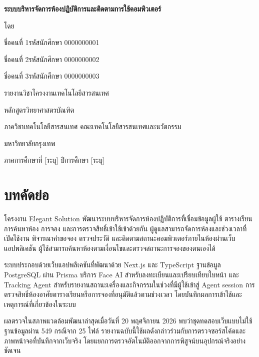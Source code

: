 \documentclass[14pt,a4paper,oneside]{extreport}
\begin{document}
\begin{titlepage}\centering
\vspace*{23mm}
{\LARGE\bfseries ระบบบริหารจัดการห้องปฏิบัติการและติดตามการใช้คอมพิวเตอร์\par}
\vspace{3mm}{\Large Elegant Solution\par}
\vspace{24mm}
{\Large โดย\par}\vspace{5mm}
{\large ชื่อคนที่ 1\quad รหัสนักศึกษา 0000000001\par}
{\large ชื่อคนที่ 2\quad รหัสนักศึกษา 0000000002\par}
{\large ชื่อคนที่ 3\quad รหัสนักศึกษา 0000000003\par}
\vspace{23mm}{\large อาจารย์ที่ปรึกษา [ระบุชื่ออาจารย์]\par}
\vfill
{\large รายงานวิชาโครงงานเทคโนโลยีสารสนเทศ\par}
{\large หลักสูตรวิทยาศาสตรบัณฑิต\par}
{\large ภาควิชาเทคโนโลยีสารสนเทศ คณะเทคโนโลยีสารสนเทศและนวัตกรรม\par}
{\large มหาวิทยาลัยกรุงเทพ\par}
{\large ภาคการศึกษาที่ [ระบุ] ปีการศึกษา [ระบุ]\par}
\end{titlepage}
\clearpage
{}
\chapter*{บทคัดย่อ}
โครงงาน Elegant Solution พัฒนาระบบบริหารจัดการห้องปฏิบัติการที่เชื่อมข้อมูลผู้ใช้ ตารางเรียน การค้นหาห้อง การจอง และการตรวจสิทธิ์เข้าใช้เข้าด้วยกัน ผู้ดูแลสามารถจัดการห้องและช่วงเวลาที่เปิดใช้งาน พิจารณาคำขอจอง ตรวจประวัติ และติดตามสถานะคอมพิวเตอร์ภายในห้องผ่านเว็บแอปพลิเคชัน ผู้ใช้สามารถค้นหาห้องตามเงื่อนไขและตรวจสถานะการจองของตนเองได้

ระบบประกอบด้วยเว็บแอปพลิเคชันที่พัฒนาด้วย Next.js และ TypeScript ฐานข้อมูล PostgreSQL ผ่าน Prisma บริการ Face AI สำหรับลงทะเบียนและเปรียบเทียบใบหน้า และ Tracking Agent สำหรับรายงานสถานะเครื่องและกิจกรรมในช่วงที่มีผู้ใช้เข้าสู่ Agent session การตรวจสิทธิ์ห้องอาศัยตารางเรียนหรือการจองที่อนุมัติแล้วตามช่วงเวลา โดยบันทึกผลการเข้าใช้และเหตุการณ์ที่เกี่ยวข้องในระบบ

ผลตรวจในสภาพแวดล้อมพัฒนาล่าสุดเมื่อวันที่ 20 พฤศจิกายน 2026 พบว่าชุดทดสอบเว็บแบบไม่ใช้ฐานข้อมูลผ่าน 549 กรณีจาก 25 ไฟล์ รายงานฉบับนี้ใช้ผลดังกล่าวร่วมกับการตรวจซอร์สโค้ดและภาพหน้าจอที่บันทึกจากเว็บจริง โดยแยกการตรวจอัตโนมัติออกจากการพิสูจน์บนอุปกรณ์จริงอย่างชัดเจน
\end{document}
